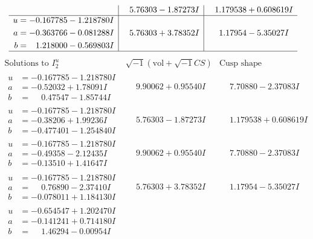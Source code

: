 \documentclass[1p]{elsarticle_modified}
\theoremstyle{definition}
\newcommand{\I}{\sqrt{-1}}
\begin{document}
$$\begin{array}{c|c|c}
 & \phantom{-}5.76303 - 1.87273 I & \phantom{-}1.179538 + 0.608619 I \\ \hline\begin{aligned}
u &= -0.167785 - 1.218780 I \\
a &= -0.363766 - 0.081288 I \\
b &= \phantom{-}1.218000 - 0.569803 I\end{aligned}
 & \phantom{-}5.76303 + 3.78352 I & \phantom{-}1.17954 - 5.35027 I\\
 \hline 
 \end{array}$$\newpage$$\begin{array}{c|c|c}  
\text{Solutions to }I^u_{2}& \I (\text{vol} + \sqrt{-1}CS) & \text{Cusp shape}\\
 \hline 
\begin{aligned}
u &= -0.167785 - 1.218780 I \\
a &= -0.52032 + 1.78091 I \\
b &= \phantom{-}0.47547 - 1.85744 I\end{aligned}
 & \phantom{-}9.90062 + 0.95540 I & \phantom{-}7.70880 - 2.37083 I \\ \hline\begin{aligned}
u &= -0.167785 - 1.218780 I \\
a &= -0.38206 + 1.99236 I \\
b &= -0.477401 - 1.254840 I\end{aligned}
 & \phantom{-}5.76303 - 1.87273 I & \phantom{-}1.179538 + 0.608619 I \\ \hline\begin{aligned}
u &= -0.167785 - 1.218780 I \\
a &= -0.49358 - 2.12435 I \\
b &= -0.13510 + 1.41647 I\end{aligned}
 & \phantom{-}9.90062 + 0.95540 I & \phantom{-}7.70880 - 2.37083 I \\ \hline\begin{aligned}
u &= -0.167785 - 1.218780 I \\
a &= \phantom{-}0.76890 - 2.37410 I \\
b &= -0.078011 + 1.184130 I\end{aligned}
 & \phantom{-}5.76303 + 3.78352 I & \phantom{-}1.17954 - 5.35027 I \\ \hline\begin{aligned}
u &= -0.654547 + 1.202470 I \\
a &= -0.141241 + 0.714180 I \\
b &= \phantom{-}1.46294 - 0.00954 I\end{aligned}

\end{array}$$
\end{document}
